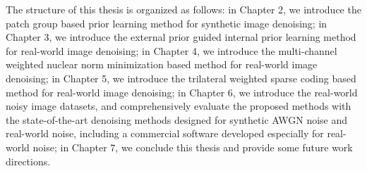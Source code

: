 The structure of this thesis is organized as follows: in Chapter 2, we introduce the patch group based prior learning method for synthetic image denoising; in Chapter 3, we introduce the external prior guided internal prior learning method for real-world image denoising; in Chapter 4, we introduce the multi-channel weighted nuclear norm minimization based method for real-world image denoising; in Chapter 5, we introduce the trilateral weighted sparse coding based method for real-world image denoising; in Chapter 6, we introduce the real-world noisy image datasets, and comprehensively evaluate the proposed methods with the state-of-the-art denoising methods designed for synthetic AWGN noise and real-world noise, including a commercial software developed especially for real-world noise; in Chapter 7, we conclude this thesis and provide some future work directions.






